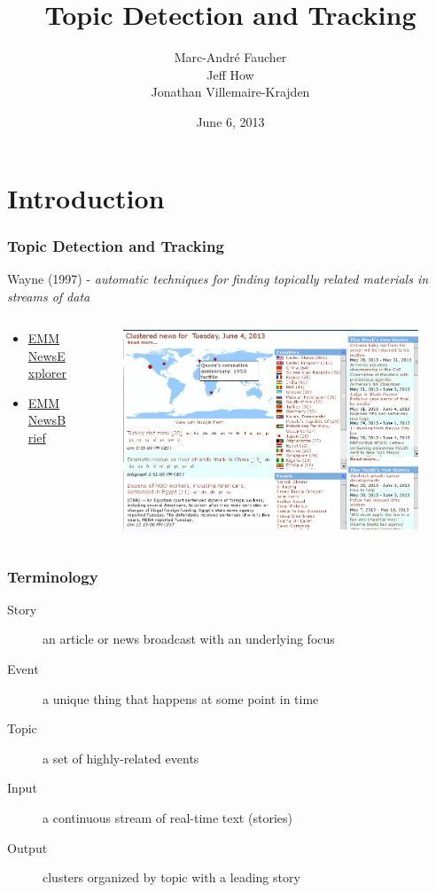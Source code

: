 \documentclass{beamer}
\title{Topic Detection and Tracking}
\author{
	Marc-André Faucher\\
	Jeff How\\
	Jonathan Villemaire-Krajden
}
\date{June 6, 2013}
\begin{document}
\begin{frame}[plain]
  \titlepage
\end{frame}

\section{Introduction}

\begin{frame}
  \frametitle{Topic Detection and Tracking}
  Wayne (1997) - \textit{automatic techniques for finding topically related materials in streams of data}
\begin{columns}
\begin{column}{.28\textwidth}
  \begin{itemize}
  \item
    \href{http://emm.newsexplorer.eu/NewsExplorer/home/en/latest.html}{EMM NewsExplorer}
  \item
    \href{http://emm.newsbrief.eu/NewsBrief/clusteredition/en/latest.html}{EMM NewsBrief}
  \end{itemize}
\end{column}
\begin{column}{.68\textwidth}
  \begin{figure}[h]
    \centering
    \includegraphics[width=\textwidth]{images/emm_0}
  \end{figure}
\end{column}
\end{columns}
\end{frame}

\begin{frame}
  \frametitle{Terminology}
  \begin{description}
  \item[Story] an article or news broadcast with an underlying focus
  \item[Event] a unique thing that happens at some point in time
  \item[Topic] a set of highly-related events
  \ \\
  \item[Input] a continuous stream of real-time text (stories)
  \item[Output] clusters organized by topic with a leading story
  \end{description}
\end{frame}
\end{document}
